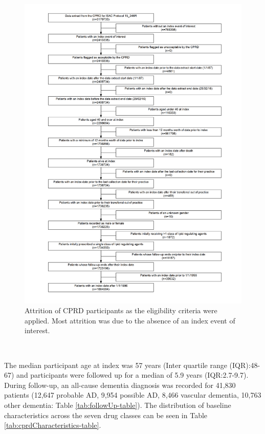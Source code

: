 \documentclass[a4paper, twoside]{templates/ociamthesis}
\begin{document}
\begin{figure}[H]
\includegraphics[width=1\linewidth]{figures/cprd-analysis/cohort_attrition} \caption[Attrition of CPRD participants]{Attrition of CPRD participants as the eligibility criteria were applied. Most attrition was due to the absence of an index event of interest.}\label{fig:cprdFlowchart}
\end{figure}

~

The median participant age at index was 57 years (Inter quartile range (IQR):48-67) and participants were followed up for a median of 5.9 years (IQR:2.7-9.7). During follow-up, an all-cause dementia diagnosis was recorded for 41,830 patients (12,647 probable AD, 9,954 possible AD, 8,466 vascular dementia, 10,763 other dementia: Table \ref{tab:followUp-table}). The distribution of baseline characteristics across the seven drug classes can be seen in Table \ref{tab:cprdCharacteristics-table}.
\end{document}
